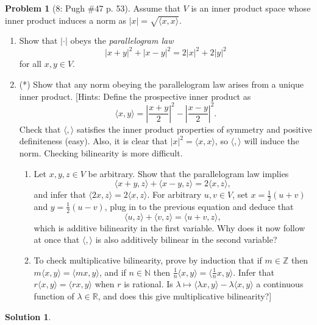 \documentclass{article}
\theoremstyle{definition}
\newtheorem*{soln}{Solution}
\newtheorem*{prob}{Problem}
\theoremstyle{theorem}
\newcommand{\R}{\mathbb{R}}
\newcommand{\Z}{\mathbb{Z}}
\newcommand{\N}{\mathbb{N}}
\begin{document}
\begin{prob}[8: Pugh \#47 p. 53]
Assume that $V$ is an inner product space whose inner product induces a norm as $|x| = \sqrt{\langle x, x \rangle}$.
\begin{enumerate}
    \item Show that $|\cdot |$ obeys the \emph{parallelogram law} $$|x+y|^2 + |x-y|^2 = 2|x|^2 + 2|y|^2$$ for all $x,y \in V$.
    \item (*) Show that any norm obeying the parallelogram law arises from a unique inner product. [Hints: Define the prospective inner product as $$\langle x, y \rangle = \left| \frac{x+y}{2} \right|^2 - \left| \frac{x-y}{2} \right|^2.$$ Check that $\langle, \rangle$ satisfies the inner product properties of symmetry and positive definiteness (easy). Also, it is clear that $|x|^2 = \langle x, x \rangle$, so $\langle, \rangle$ will induce the norm. Checking bilinearity is more difficult.
    \begin{enumerate}
        \item Let $x,y,z \in V$ be arbitrary. Show that the parallelogram law implies $$\langle x+y,z \rangle + \langle x-y,z \rangle = 2 \langle x, z \rangle,$$ and infer that $\langle 2x,z \rangle = 2 \langle x, z \rangle$. For arbitrary $u,v \in V$, set $x = \frac{1}{2}(u + v)$ and $y = \frac{1}{2}(u-v)$, plug in to the previous equation and deduce that $$\langle u,z \rangle + \langle v,z \rangle = \langle u+v,z \rangle,$$ which is additive bilinearity in the first variable. Why does it now follow at once that $\langle, \rangle$ is also additively bilinear in the second variable?
        \item To check multiplicative bilinearity, prove by induction that if $m \in \Z$ then $m \langle x, y \rangle = \langle mx, y \rangle$, and if $n \in \N$ then $\frac{1}{n} \langle x, y \rangle = \langle \frac{1}{n}x, y \rangle$. Infer that $r \langle x, y \rangle = \langle rx, y \rangle$ when $r$ is rational. Is $\lambda \mapsto \langle \lambda x, y \rangle - \lambda \langle x, y \rangle$ a continuous function of $\lambda \in \R$, and does this give multiplicative bilinearity?]
    \end{enumerate}
\end{enumerate}
\end{prob}
\begin{soln}

\end{soln}
\vspace{1in}
\end{document}
